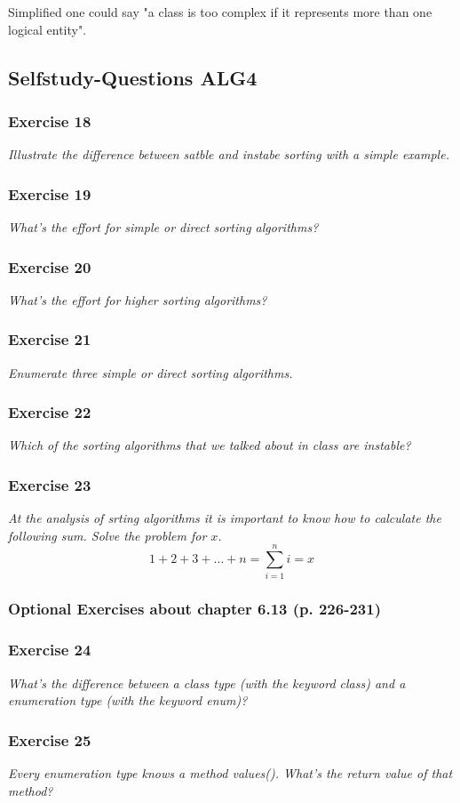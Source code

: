 Simplified one could say "a class is too complex if it represents more than
one logical entity".

\subsection{Selfstudy-Questions ALG4}

\subsubsection*{Exercise 18}
\textit{Illustrate the difference between satble and instabe sorting with a 
simple example.} \\

\subsubsection*{Exercise 19}
\textit{What's the effort for simple or direct sorting algorithms?} \\

\subsubsection*{Exercise 20}
\textit{What's the effort for higher sorting algorithms?} \\

\subsubsection*{Exercise 21}
\textit{Enumerate three simple or direct sorting algorithms.} \\

\subsubsection*{Exercise 22}
\textit{Which of the sorting algorithms that we talked about in class 
are instable?} \\

\subsubsection*{Exercise 23}
\textit{At the analysis of srting algorithms it is important to know how to
calculate the following sum. Solve the problem for $x$.} \\
\[ 1 + 2 + 3 + \dots + n = \sum_{i=1}^{n} i = x \]

\subsubsection{Optional Exercises about chapter 6.13 (p. 226-231)}

\subsubsection*{Exercise 24}
\textit{What's the difference between a class type (with the keyword class)
and a enumeration type (with the keyword enum)?} \\

\subsubsection*{Exercise 25}
\textit{Every enumeration type knows a method values(). What's the return
value of that method?} \\


